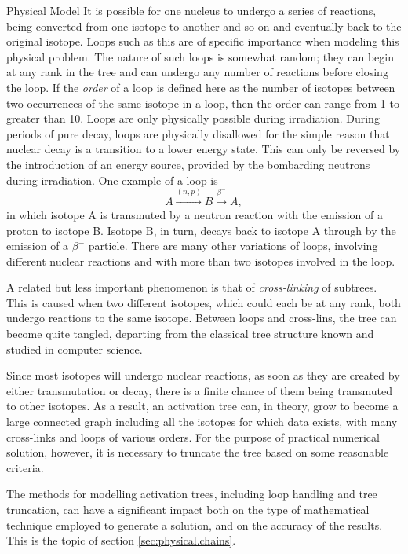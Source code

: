 \begin{chapter}{Physical Model\label{chap:physical}}
It is possible for one nucleus to undergo a series of reactions, being
converted from one isotope to another and so on and eventually back to
the original isotope.  Loops such as this are of specific importance
when modeling this physical problem.  The nature of such loops is
somewhat random; they can begin at any rank in the tree and can
undergo any number of reactions before closing the loop.  If the
\textsl{order} of a loop is defined here as the number of isotopes
between two occurrences of the same isotope in a loop, then the order
can range from 1 to greater than 10.  Loops are only physically
possible during irradiation.  During periods of pure decay, loops are
physically disallowed for the simple reason that nuclear decay is a
transition to a lower energy state.  This can only be reversed by the
introduction of an energy source, provided by the bombarding neutrons
during irradiation.  One example of a loop is
$$A \stackrel{(n,p)}{\longrightarrow} B
\stackrel{\beta^-}{\longrightarrow} A,$$
in which isotope A is transmuted by a neutron reaction with the
emission of a proton to isotope B.  Isotope B, in turn, decays back to
isotope A through by the emission of a $\beta^-$ particle.  There are
many other variations of loops, involving different nuclear reactions
and with more than two isotopes involved in the loop.
    
A related but less important phenomenon is that of
\textsl{cross-linking} of subtrees.  This is caused when two different
isotopes, which could each be at any rank, both undergo reactions to
the same isotope.  Between loops and cross-lins, the tree can become
quite tangled, departing from the classical tree structure known and
studied in computer science.

Since most isotopes will undergo nuclear reactions, as soon as they
are created by either transmutation or decay, there is a finite chance
of them being transmuted to other isotopes.  As a result, an
activation tree can, in theory, grow to become a large connected graph
including all the isotopes for which data exists, with many
cross-links and loops of various orders.  For the purpose of practical
numerical solution, however, it is necessary to truncate the tree
based on some reasonable criteria.

The methods for modelling activation trees, including loop handling
and tree truncation, can have a significant impact both on the type of
mathematical technique employed to generate a solution, and on the
accuracy of the results.  This is the topic of section
\ref{sec:physical.chains}.


\end{chapter}
